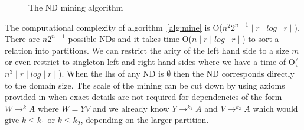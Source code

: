 \medskip

{\renewcommand{\baselinestretch}{1}
\begin{figure}[ht]
\begin{center}
\end{center}
\caption{\label{numdep:fig:nd_mine} The ND mining algorithm}
\end{figure}
}

The computational complexity of algorithm~\ref{alg:mine} is O($n^2 2^{n-1}
\mid r \mid log \mid r \mid$). There are $n2^{n-1}$ possible NDs and
it takes time O($n \mid r \mid log \mid r \mid$) to sort a relation into
partitions. We can restrict the arity of the left hand side to a size
$m$ or even restrict to singleton left and right
hand sides where we have a time of O($n^3\mid r \mid log \mid r \mid$).
When the lhs of any ND is $\emptyset$ then the ND corresponds
directly to the domain size.
The scale of the mining can be cut down by using axioms provided
in \cite{gm85b,gm85a} when exact details are not required for
dependencies of the form $W \to^k A$ where $W = YV$ and we already
know $Y \to^{k_1} A$ and $V \to^{k_2} A$ which would give $k \le k_1$
or $k \le k_2$, depending on the larger partition. 

